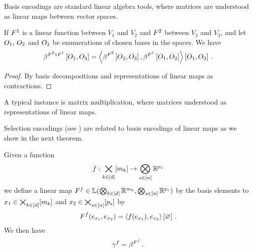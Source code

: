 Basis encodings are standard linear algebra tools, where matrices are understood as linear maps between vector spaces.

\begin{theorem}
    \label{the:linearCompositionBasisEncoding}
    If $F^{1}$ is a linear function between $V_1$ and $V_2$  and $F^{2}$ between $V_2$ and $V_3$, and let $O_{1},\,O_{2}$ and $O_{3}$ be enumerations of chosen bases in the spaces.
    We have
    \begin{align*}
        \beta^{F^{2}\circ F^{1}}\left[O_{1},O_{3}\right]
        = \left\langle 
            \beta^{F^{2}}\left[O_{2},O_{3}\right], \beta^{F^{1}}\left[O_{1},O_{2}\right]
        \right\rangle \left[ O_{1},O_{3} \right]  \, .
    \end{align*}
\end{theorem}
\begin{proof}
    By basis decompositions and representations of linear maps as contractions.
\end{proof}

A typical instance is matrix multiplication, where matrices understood as representations of linear maps.


Selection encodings (see ) are related to basis encodings of linear maps as we show in the next theorem.

\begin{theorem}
    \label{the:selectionToBasisEncoding}
    Given a function
    \[ f : \bigtimes_{k\in[d]}[m_{k}] \rightarrow \bigotimes_{s\in[n]}\mathbb{R}^{p_{s}} \]
    we define a linear map $F^{f}\in\mathbb{L}(\bigotimes_{k\in[d]} \mathbb{R}^{m_{k}},\bigotimes_{s\in[n]}\mathbb{R}^{p_{s}})$ by the basis elements to $x_{1} \in\bigtimes_{k\in[d]}[m_{k}]$ and $x_{2}\in\bigtimes_{s\in[n]}[p_{s}]$ by
    \begin{align*}
        F^{f}(e_{x_{1}},e_{x_{2}})
        = \left\langle f(e_{x_{1}}),e_{x_{2}}\right\rangle \left[ \varnothing \right] \, .
    \end{align*}
    We then have
    \begin{align*}
        \gamma^{f} = \beta^{F^{f}} \, .
    \end{align*}
\end{theorem}


